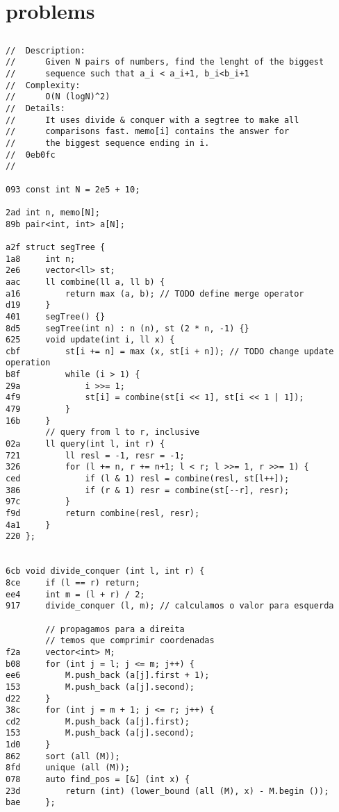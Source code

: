 \documentclass[11pt, a4paper, twoside]{article}
\begin{document}
%
%

\section{problems}

\subsection{}
\begin{lstlisting}
//  Description: 
//      Given N pairs of numbers, find the lenght of the biggest
//      sequence such that a_i < a_i+1, b_i<b_i+1
//  Complexity: 
//      O(N (logN)^2)
//  Details:
//      It uses divide & conquer with a segtree to make all
//      comparisons fast. memo[i] contains the answer for 
//      the biggest sequence ending in i.
//  0eb0fc
//

093 const int N = 2e5 + 10;

2ad int n, memo[N];
89b pair<int, int> a[N];

a2f struct segTree {
1a8     int n;
2e6     vector<ll> st;
aac     ll combine(ll a, ll b) {
a16         return max (a, b); // TODO define merge operator
d19     }
401     segTree() {}
8d5     segTree(int n) : n (n), st (2 * n, -1) {}
625     void update(int i, ll x) {
cbf         st[i += n] = max (x, st[i + n]); // TODO change update operation
b8f         while (i > 1) {
29a             i >>= 1;
4f9             st[i] = combine(st[i << 1], st[i << 1 | 1]);
479         }
16b     }
        // query from l to r, inclusive
02a     ll query(int l, int r) {
721         ll resl = -1, resr = -1;
326         for (l += n, r += n+1; l < r; l >>= 1, r >>= 1) {
ced             if (l & 1) resl = combine(resl, st[l++]);
386             if (r & 1) resr = combine(st[--r], resr);
97c         }
f9d         return combine(resl, resr);
4a1     }
220 };


6cb void divide_conquer (int l, int r) {
8ce     if (l == r) return;
ee4     int m = (l + r) / 2;
917     divide_conquer (l, m); // calculamos o valor para esquerda
    
        // propagamos para a direita
        // temos que comprimir coordenadas
f2a     vector<int> M;
b08     for (int j = l; j <= m; j++) {
ee6         M.push_back (a[j].first + 1);
153         M.push_back (a[j].second);
d22     }
38c     for (int j = m + 1; j <= r; j++) {
cd2         M.push_back (a[j].first);
153         M.push_back (a[j].second);
1d0     }
862     sort (all (M));
8fd     unique (all (M));
078     auto find_pos = [&] (int x) {
23d         return (int) (lower_bound (all (M), x) - M.begin ());
bae     };
    

\end{lstlisting}
\end{document}
